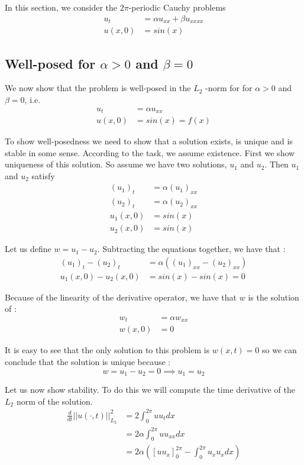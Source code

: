 In this section, we consider the $2\pi$-periodic Cauchy problems
\begin{align*}
u_t &= \alpha u_{xx} + \beta u_{xxxx} \\
u(x,0) &= sin(x)
\end{align*}


\subsection{Well-posed for $\alpha>0$ and $\beta = 0$}
We now show that the problem is well-posed in the $L_2$ -norm for for $\alpha>0$ and $\beta = 0$, i.e.
\begin{align*}
u_t &= \alpha u_{xx} \\
u(x,0) &= sin(x) = f(x)
\end{align*} 

To show well-posedness we need to show that a solution exists, is unique and is stable in some sense. According to the task, we assume existence. First we show uniqueness of this solution. So assume we have two solutions, $u_1$ and $u_2$. Then $u_1$ and $u_2$ satisfy
\begin{align*}
(u_1)_t &= \alpha (u_1)_{xx}\\ 
(u_2)_t &= \alpha (u_2)_{xx}\\
u_1(x,0) &= sin(x)\\
u_2(x,0) &= sin(x)
\end{align*}

Let us define $w=u_1-u_2$. Subtracting the equations together, we have that : 
\begin{align*}
(u_1)_t-(u_2)_t & = \alpha ((u_1)_{xx}-(u_2)_{xx})\\ 
u_1(x,0)-u_2(x,0) &= sin(x)-sin(x)=0
\end{align*}

Because of the linearity of the derivative operator, we have that $w$ is the solution of :
\begin{align*}
w_t & = \alpha w_{xx}\\ 
w(x,0) &= 0
\end{align*}

It is easy to see that the only solution to this problem is $w(x,t) = 0$ so we can conclude that the solution is unique because :
$$w=u_1-u_2 = 0 \implies u_1 = u_2$$

Let us now show stability. To do this we will compute the time derivative of the $L_2$ norm of the solution.
\begin{align*}
\frac{d}{dt} ||u(\cdot,t)||^2_{L_2} &= 2\int_0^{2\pi} u u_t dx \\
&=2\alpha \int_0^{2\pi} u u_{xx} dx\\
&=2\alpha ([uu_x]^{2\pi}_0 - \int_0^{2\pi} u_x u_x dx)
\end{align*}

